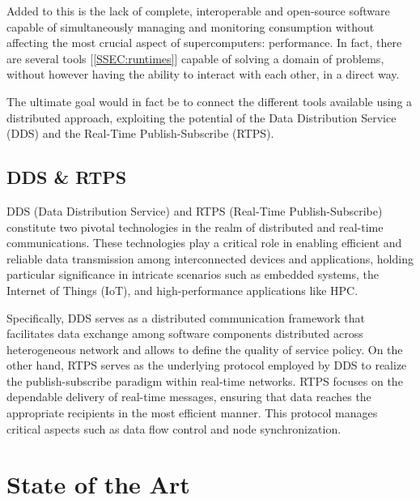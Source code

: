 Added to this is the lack of complete, interoperable and open-source software capable of simultaneously managing and monitoring consumption without affecting the most crucial aspect of supercomputers: performance. In fact, there are several tools [\ref{SSEC:runtimes}] capable of solving a domain of problems, without however having the ability to interact with each other, in a direct way.

The ultimate goal would in fact be to connect the different tools available using a distributed approach, exploiting the potential of the Data Distribution Service (DDS) and the Real-Time Publish-Subscribe (RTPS).%

\subsection{DDS \& RTPS} \label{SEC:dds}
DDS (Data Distribution Service)\cite{DDS} and RTPS (Real-Time Publish-Subscribe)\cite{RTPS} constitute two pivotal technologies in the realm of distributed and real-time communications. These technologies play a critical role in enabling efficient and reliable data transmission among interconnected devices and applications, holding particular significance in intricate scenarios such as embedded systems, the Internet of Things (IoT), and high-performance applications like HPC.

Specifically, DDS serves as a distributed communication framework that facilitates data exchange among software components distributed across heterogeneous network and allows to define the quality of service policy. On the other hand, RTPS serves as the underlying protocol employed by DDS to realize the publish-subscribe paradigm within real-time networks. RTPS focuses on the dependable delivery of real-time messages, ensuring that data reaches the appropriate recipients in the most efficient manner. This protocol manages critical aspects such as data flow control and node synchronization.

\section{State of the Art} \label{SEC:soa}

